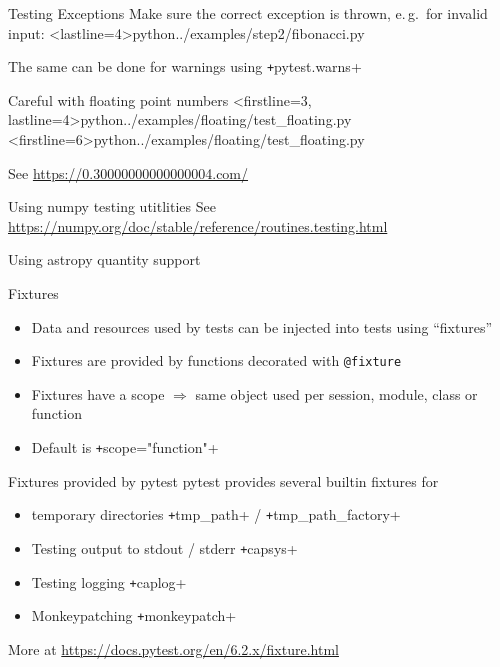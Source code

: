 \begin{frame}[c]{Testing Exceptions}
  Make sure the correct exception is thrown, e.\,g.\ for invalid input:
  <lastline=4>{python}{../examples/step2/fibonacci.py}

  The same can be done for warnings using \texttt+pytest.warns+
\end{frame}


\begin{frame}[c, fragile]{Careful with floating point numbers}
  <firstline=3, lastline=4>{python}{../examples/floating/test_floating.py}
  <firstline=6>{python}{../examples/floating/test_floating.py}

  See \url{https://0.30000000000000004.com/}
\end{frame}

\begin{frame}[c, fragile]{Using numpy testing utitlities}
  See \url{https://numpy.org/doc/stable/reference/routines.testing.html}
\end{frame}

\begin{frame}[c, fragile]{Using astropy quantity support}
\end{frame}

\begin{frame}[c]{Fixtures}
  \begin{itemize}
    \item Data and resources used by tests can be injected into tests using \enquote{fixtures}
    \item Fixtures are provided by functions decorated with \texttt{@fixture}
    \item Fixtures have a scope $⇒$ same object used per session, module, class or function
    \item Default is \texttt+scope="function"+
  \end{itemize}
\end{frame}

\begin{frame}[c]{Fixtures provided by pytest}
  pytest provides several builtin fixtures for
  \begin{itemize}
    \item temporary directories \texttt+tmp_path+ / \texttt+tmp_path_factory+
    \item Testing output to stdout / stderr \texttt+capsys+
    \item Testing logging \texttt+caplog+
    \item Monkeypatching \texttt+monkeypatch+
  \end{itemize}
  More at \url{https://docs.pytest.org/en/6.2.x/fixture.html}
\end{frame}

